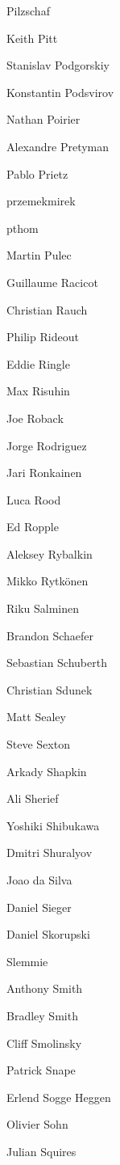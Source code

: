 \begin{DoxyItemize}
\item Pilzschaf
\item Keith Pitt
\item Stanislav Podgorskiy
\item Konstantin Podsvirov
\item Nathan Poirier
\item Alexandre Pretyman
\item Pablo Prietz
\item przemekmirek
\item pthom
\item Martin Pulec
\item Guillaume Racicot
\item Christian Rauch
\item Philip Rideout
\item Eddie Ringle
\item Max Risuhin
\item Joe Roback
\item Jorge Rodriguez
\item Jari Ronkainen
\item Luca Rood
\item Ed Ropple
\item Aleksey Rybalkin
\item Mikko Rytkönen
\item Riku Salminen
\item Brandon Schaefer
\item Sebastian Schuberth
\item Christian Sdunek
\item Matt Sealey
\item Steve Sexton
\item Arkady Shapkin
\item Ali Sherief
\item Yoshiki Shibukawa
\item Dmitri Shuralyov
\item Joao da Silva
\item Daniel Sieger
\item Daniel Skorupski
\item Slemmie
\item Anthony Smith
\item Bradley Smith
\item Cliff Smolinsky
\item Patrick Snape
\item Erlend Sogge Heggen
\item Olivier Sohn
\item Julian Squires

\end{DoxyItemize}
